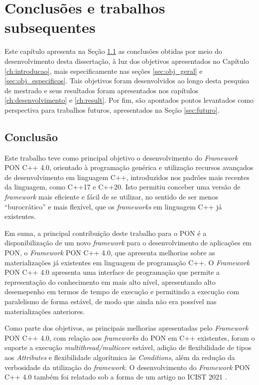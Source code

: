 \chapter{Conclusões e trabalhos subsequentes}\label{ch:conclusao}

Este capítulo apresenta na Seção \ref{sec:conclusao} as conclusões obtidas por
meio do desenvolvimento desta dissertação, à luz dos objetivos apresentados no
Capítulo \ref{ch:introducao}, mais especificamente nas seções
\ref{sec:obj_geral} e \ref{sec:obj_especificos}. Tais objetivos foram
desenvolvidos ao longo desta pesquisa de mestrado e seus resultados foram
apresentados nos capítulos \ref{ch:desenvolvimento} e \ref{ch:result}. Por fim,
são apontados pontos levantados como perspectiva para trabalhos futuros,
apresentados na Seção \ref{sec:futuro}.

\section{Conclusão}\label{sec:conclusao}

Este trabalho teve como principal objetivo o desenvolvimento do
\textit{Framework} PON C++ 4.0, orientado à programação genérica e utilização
recursos avançados de desenvolvimento em linguagem C++, introduzidos nos padrões
mais recentes da linguagem, como C++17 e C++20. Isto permitiu conceber uma
versão de \textit{framework} mais eficiente e fácil de se utilizar, no sentido
de ser menos \enquote{burocrático} e mais flexível, que os \textit{frameworks} em
linguagem C++ já existentes.

Em suma, a principal contribuição deste trabalho para o PON é a disponibilização
de um novo \textit{framework} para o desenvolvimento de aplicações em PON, o
\textit{Framework} PON C++ 4.0, que apresenta melhorias sobre as materializações
já existentes em linguagem de programação C++. O \textit{Framework} PON C++ 4.0
apresenta uma interface de programação que permite a representação do
conhecimento em mais alto nível, apresentando alto desemepenho em termos
de tempo de execução e permitindo a execução com paralelismo de forma estável,
de modo que ainda não era possível nas materializações anteriores.

Como parte dos objetivos, as principais melhorias apresentadas pelo
\textit{Framework} PON C++ 4.0, com relação aos \textit{frameworks} do PON em
C++ existentes, foram o suporte a execução \textit{multithread/multicore}
estável, adição de flexibilidade de tipos aos \textit{Attributes} e
flexibilidade algorítmica às \textit{Conditions}, além da redução da verbosidade
da utilização do \textit{framework}. O desenvolvimento do \textit{Framework} PON
C++ 4.0 também foi relatado sob a forma de um artigo no ICIST 2021
\cite{neves_icist_2021}.

